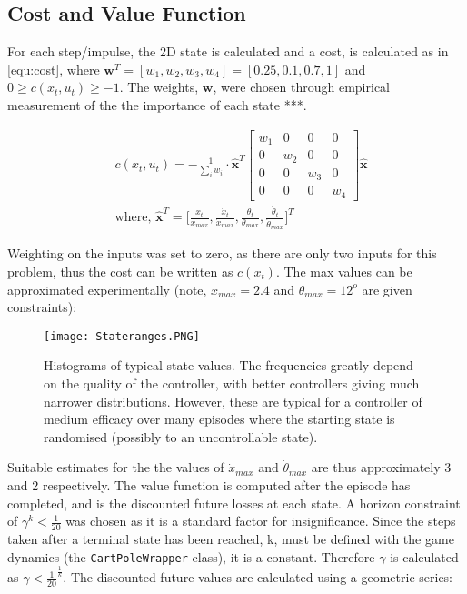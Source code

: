 \documentclass[../main.tex]{subfiles}
\begin{document}
\subsection{Cost and Value Function}

For each step/impulse, the 2D state is calculated and a cost, is calculated as in \cref{equ:cost}, where $\boldsymbol{w}^T = [w_1, w_2, w_3, w_4] = [0.25, 0.1, 0.7, 1]$ and $0 \geq c(x_t, u_t) \geq -1$. The weights, $\boldsymbol{w}$, were chosen through empirical measurement of the the importance of each state ***.

\begin{align}
   \label{equ:cost}
   &c(x_t, u_t) = - \frac{1}{\sum_{i} w_i} \cdot \boldsymbol{\hat{x}}^T \begin{bmatrix} w_1 & 0 & 0 & 0\\ 0 & w_2 & 0 & 0\\ 0 & 0 & w_3 & 0 \\ 0 & 0 & 0 & w_4 \end{bmatrix}  \boldsymbol{\hat{x}} \\
   &\text{where,   } \boldsymbol{\hat{x}}^T = \bigg[\frac{x_t}{x_{max}},  \frac{\dot{x}_t}{\dot{x}_{max}},  \frac{\theta_t}{\theta_{max}},  \frac{\dot{\theta}_t}{\dot{\theta}_{max}}\bigg]^T
\end{align}

 Weighting on the inputs was set to zero, as there are only two inputs for this problem, thus the cost can be written as $c(x_t)$. The max values can be approximated experimentally (note, $x_{max} = 2.4$ and $\theta_{max} = 12^o$ are given constraints):

\begin{figure}[H]
   \centering
   \texttt{[image: Stateranges.PNG]}
   \caption{\label{fig:ranges} Histograms of typical state values. The frequencies greatly depend on the quality of the controller, with better controllers giving much narrower distributions. However, these are typical for a controller of medium efficacy over many episodes where the starting state is randomised (possibly to an uncontrollable state).}
\end{figure}

Suitable estimates for the the values of $\dot{x}_{max}$ and $\dot{\theta}_{max}$ are thus approximately 3 and 2 respectively. The value function is computed after the episode has completed, and is the discounted future losses at each state. A horizon constraint of $\gamma^{k} < \frac{1}{20}$ was chosen as it is a standard factor for insignificance. Since the steps taken after a terminal state has been reached, k, must be defined with the game dynamics (the \texttt{CartPoleWrapper} class), it is a constant. Therefore $\gamma$ is calculated as $\gamma < \frac{1}{20}^{\frac{1}{k}}$. The discounted future values are calculated using a geometric series:
\end{document}
